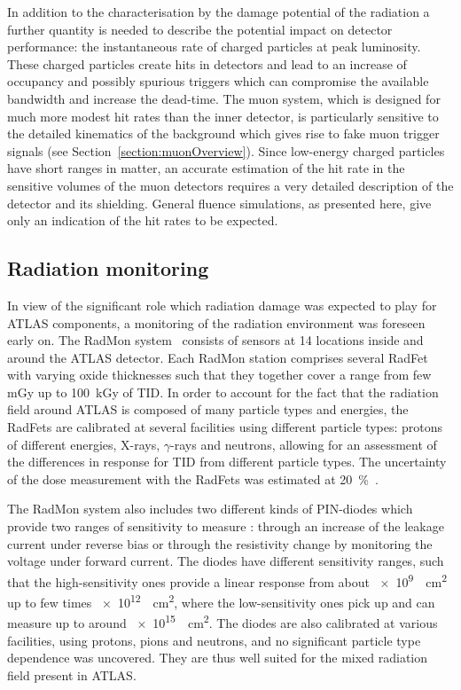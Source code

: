 \documentclass[cernpreprint, atlasdraft=false, UKenglish,british,orcidlogo, texmf, orcidlogo]{atlasdoc}
\begin{document}
In addition to the characterisation by the damage potential of the radiation a further quantity
is needed to describe the potential impact on detector performance: the instantaneous rate of charged
particles at peak luminosity. These charged particles create hits in detectors and lead to an increase of occupancy and possibly spurious
triggers which can compromise the available bandwidth and increase the dead-time. The muon system, which
is designed for much more modest hit rates than the inner detector, is particularly sensitive to
the detailed kinematics of the background which gives rise to fake muon trigger signals (see Section~\ref{section:muonOverview}).
Since low-energy charged particles have short ranges in matter, an accurate
estimation of the hit rate in the sensitive volumes of the muon detectors requires a very detailed description
of the detector and its shielding. General fluence simulations, as presented here, give only an indication of the
hit rates to be expected.
 
\subsection{Radiation monitoring}
\label{sect:radmon}
 
In view of the significant role which radiation damage was expected to play for ATLAS components, a monitoring
of the radiation environment was foreseen early on. The RadMon system~\cite{RadMonRef} consists of sensors at 14 locations
inside and around the ATLAS detector. Each RadMon station comprises several \gls{RadFet} with varying oxide thicknesses such that they
together cover a range from few \si{\milli\gray} up to \SI{100}{\kilo\gray} of \gls{TID}.
In order to account for the fact that the radiation field around ATLAS is composed of many particle types and energies,
the \glspl{RadFet} are calibrated at several facilities using different particle types: protons of different energies, X-rays,
$\gamma$-rays and neutrons, allowing for an assessment of the differences in response for \gls{TID} from different particle types.
The uncertainty of the dose measurement with the \glspl{RadFet} was estimated at \SI{20}{\percent}~\cite{RadMonRef}.
 
The RadMon system also includes two different kinds of \gls{PIN}-diodes which provide two ranges of sensitivity to measure \phieqv: through
an increase of the leakage current under reverse bias or through the resistivity change by monitoring the voltage under forward current.
The diodes have different sensitivity ranges, such that the high-sensitivity ones provide a linear response
from about \SI{e9}{\per\cm\squared} up to few times \SI{e12}{\per\cm\squared}, where the
low-sensitivity ones pick up and can measure  up to around \SI{e15}{\per\cm\squared}. The diodes are also calibrated at various facilities,
using protons, pions and neutrons, and no significant particle type dependence was uncovered. They are thus
well suited for the mixed radiation field present in ATLAS.
 
\end{document}

